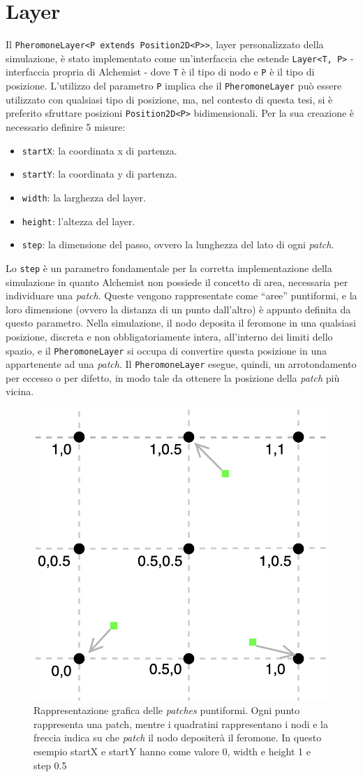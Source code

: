 \section{Layer}\label{layer}
Il \texttt{PheromoneLayer<P extends Position2D<P>>}, layer personalizzato della simulazione, è stato implementato 
come un'interfaccia che estende \texttt{Layer<T, P>} - interfaccia propria di Alchemist -
dove \texttt{T} è il tipo di nodo e \texttt{P} è il tipo di posizione. 
L'utilizzo del parametro \texttt{P} implica che il \texttt{PheromoneLayer} può essere utilizzato con qualsiasi tipo di posizione, ma, nel contesto di questa tesi,
si è preferito sfruttare posizioni \texttt{Position2D<P>} bidimensionali.
Per la sua creazione è necessario definire 5 misure:
\begin{itemize}
    \item \texttt{startX}: la coordinata x di partenza.
    \item \texttt{startY}: la coordinata y di partenza.
    \item \texttt{width}: la larghezza del layer.
    \item \texttt{height}: l'altezza del layer.
    \item \texttt{step}: la dimensione del passo, ovvero la lunghezza del lato di ogni \textit{patch}.
\end{itemize}
Lo \texttt{step} è un parametro fondamentale per la corretta implementazione della simulazione
in quanto Alchemist non possiede il concetto di area, necessaria per individuare una \textit{patch}.
Queste vengono rappresentate come ``aree'' puntiformi, e la loro dimensione (ovvero la distanza di un punto dall'altro) è appunto definita da questo parametro.
Nella simulazione, il nodo deposita il feromone in una qualsiasi posizione, discreta e non obbligatoriamente intera, all'interno dei limiti dello spazio, e il \texttt{PheromoneLayer} 
si occupa di convertire questa posizione in una appartenente ad una \textit{patch}. 
Il \texttt{PheromoneLayer} esegue, quindi, un arrotondamento per eccesso o per difetto, in modo tale da ottenere la posizione della \textit{patch} più vicina.
\begin{figure}[ht]
    \centering
    \includegraphics[width=.5\linewidth]{figures/patch-nodi.png}
    \caption{Rappresentazione grafica delle \textit{patches} puntiformi. Ogni punto rappresenta una patch,
    mentre i quadratini rappresentano i nodi e la freccia indica su che \textit{patch} il nodo depositerà il feromone. In questo esempio
    startX e startY hanno come valore 0, width e height 1 e step 0.5}\label{fig:patch-nodi}
\end{figure}

